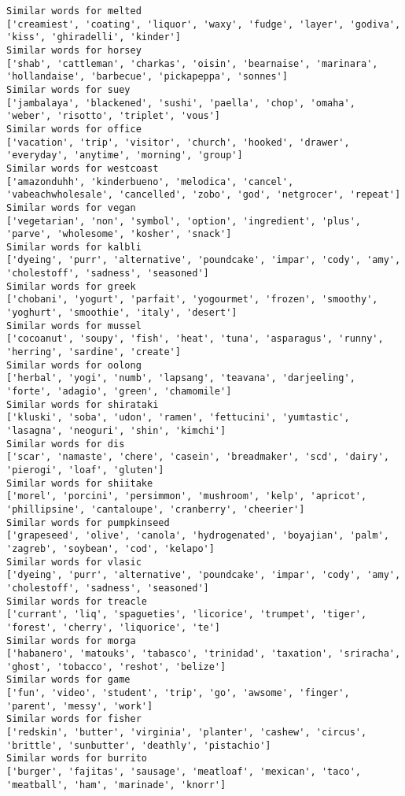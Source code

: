 \documentclass[11pt]{article}
\begin{document}
\begin{Verbatim}[commandchars=\\\{\}]
Similar words for melted
['creamiest', 'coating', 'liquor', 'waxy', 'fudge', 'layer', 'godiva', 'kiss', 'ghiradelli', 'kinder']
Similar words for horsey
['shab', 'cattleman', 'charkas', 'oisin', 'bearnaise', 'marinara', 'hollandaise', 'barbecue', 'pickapeppa', 'sonnes']
Similar words for suey
['jambalaya', 'blackened', 'sushi', 'paella', 'chop', 'omaha', 'weber', 'risotto', 'triplet', 'vous']
Similar words for office
['vacation', 'trip', 'visitor', 'church', 'hooked', 'drawer', 'everyday', 'anytime', 'morning', 'group']
Similar words for westcoast
['amazonduhh', 'kinderbueno', 'melodica', 'cancel', 'vabeachwholesale', 'cancelled', 'zobo', 'god', 'netgrocer', 'repeat']
Similar words for vegan
['vegetarian', 'non', 'symbol', 'option', 'ingredient', 'plus', 'parve', 'wholesome', 'kosher', 'snack']
Similar words for kalbli
['dyeing', 'purr', 'alternative', 'poundcake', 'impar', 'cody', 'amy', 'cholestoff', 'sadness', 'seasoned']
Similar words for greek
['chobani', 'yogurt', 'parfait', 'yogourmet', 'frozen', 'smoothy', 'yoghurt', 'smoothie', 'italy', 'desert']
Similar words for mussel
['cocoanut', 'soupy', 'fish', 'heat', 'tuna', 'asparagus', 'runny', 'herring', 'sardine', 'create']
Similar words for oolong
['herbal', 'yogi', 'numb', 'lapsang', 'teavana', 'darjeeling', 'forte', 'adagio', 'green', 'chamomile']
Similar words for shirataki
['kluski', 'soba', 'udon', 'ramen', 'fettucini', 'yumtastic', 'lasagna', 'neoguri', 'shin', 'kimchi']
Similar words for dis
['scar', 'namaste', 'chere', 'casein', 'breadmaker', 'scd', 'dairy', 'pierogi', 'loaf', 'gluten']
Similar words for shiitake
['morel', 'porcini', 'persimmon', 'mushroom', 'kelp', 'apricot', 'phillipsine', 'cantaloupe', 'cranberry', 'cheerier']
Similar words for pumpkinseed
['grapeseed', 'olive', 'canola', 'hydrogenated', 'boyajian', 'palm', 'zagreb', 'soybean', 'cod', 'kelapo']
Similar words for vlasic
['dyeing', 'purr', 'alternative', 'poundcake', 'impar', 'cody', 'amy', 'cholestoff', 'sadness', 'seasoned']
Similar words for treacle
['currant', 'liq', 'spagueties', 'licorice', 'trumpet', 'tiger', 'forest', 'cherry', 'liquorice', 'te']
Similar words for morga
['habanero', 'matouks', 'tabasco', 'trinidad', 'taxation', 'sriracha', 'ghost', 'tobacco', 'reshot', 'belize']
Similar words for game
['fun', 'video', 'student', 'trip', 'go', 'awsome', 'finger', 'parent', 'messy', 'work']
Similar words for fisher
['redskin', 'butter', 'virginia', 'planter', 'cashew', 'circus', 'brittle', 'sunbutter', 'deathly', 'pistachio']
Similar words for burrito
['burger', 'fajitas', 'sausage', 'meatloaf', 'mexican', 'taco', 'meatball', 'ham', 'marinade', 'knorr']

\end{Verbatim}
\end{document}

